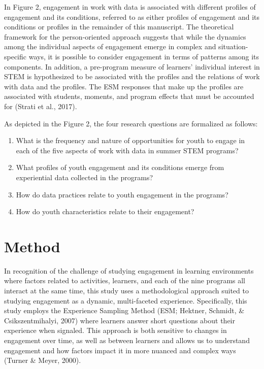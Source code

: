 \documentclass[]{msu-thesis}
\providecommand{\tightlist}{%
  \setlength{\itemsep}{0pt}\setlength{\parskip}{0pt}}
\theoremstyle{definition}
\theoremstyle{definition}
\theoremstyle{definition}
\theoremstyle{remark}
\begin{document}
In Figure 2, engagement in work with data is associated with different
profiles of engagement and its conditions, referred to as either
profiles of engagement and its conditions or profiles in the remainder
of this manuscript. The theoretical framework for the person-oriented
approach suggests that while the dynamics among the individual aspects
of engagement emerge in complex and situation-specific ways, it is
possible to consider engagement in terms of patterns among its
components. In addition, a pre-program measure of learners' individual
interest in STEM is hypothesized to be associated with the profiles and
the relations of work with data and the profiles. The ESM responses that
make up the profiles are associated with students, moments, and program
effects that must be accounted for (Strati et al., 2017).

As depicted in the Figure 2, the four research questions are formalized
as follows:

\begin{enumerate}
\def\labelenumi{\arabic{enumi}.}
\tightlist
\item
  What is the frequency and nature of opportunities for youth to engage
  in each of the five aspects of work with data in summer STEM programs?
\item
  What profiles of youth engagement and its conditions emerge from
  experiential data collected in the programs?
\item
  How do data practices relate to youth engagement in the programs?
\item
  How do youth characteristics relate to their engagement?
\end{enumerate}

\chapter{Method}\label{method}

In recognition of the challenge of studying engagement in learning
environments where factors related to activities, learners, and each of
the nine programs all interact at the same time, this study uses a
methodological approach suited to studying engagement as a dynamic,
multi-faceted experience. Specifically, this study employs the
Experience Sampling Method (ESM; Hektner, Schmidt, \& Csikszentmihalyi,
2007) where learners answer short questions about their experience when
signaled. This approach is both sensitive to changes in engagement over
time, as well as between learners and allows us to understand engagement
and how factors impact it in more nuanced and complex ways (Turner \&
Meyer, 2000).
\end{document}
